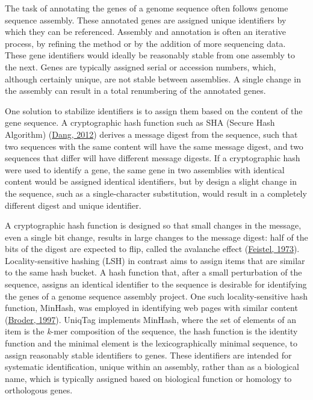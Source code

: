\documentclass{bioinfo}
\begin{document}
The task of annotating the genes of a genome sequence often follows
genome sequence assembly. These annotated genes are assigned unique
identifiers by which they can be referenced. Assembly and annotation is
often an iterative process, by refining the method or by the addition of
more sequencing data. These gene identifiers would ideally be reasonably
stable from one assembly to the next. Genes are typically assigned
serial or accession numbers, which, although certainly unique, are not
stable between assemblies. A single change in the assembly can result in
a total renumbering of the annotated genes.

One solution to stabilize identifiers is to assign them based on the
content of the gene sequence. A cryptographic hash function such as SHA
(Secure Hash Algorithm)
(\href{http://www.nist.gov/manuscript-publication-search.cfm?pub_id=910977}{Dang,
2012}) derives a message digest from the sequence, such that two
sequences with the same content will have the same message digest, and
two sequences that differ will have different message digests. If a
cryptographic hash were used to identify a gene, the same gene in two
assemblies with identical content would be assigned identical
identifiers, but by design a slight change in the sequence, such as a
single-character substitution, would result in a completely different
digest and unique identifier.

A cryptographic hash function is designed so that small changes in the
message, even a single bit change, results in large changes to the
message digest: half of the bits of the digest are expected to flip,
called the avalanche effect
(\href{http://www.scientificamerican.com/article/cryptography-and-computer-privacy/}{Feistel,
1973}). Locality-sensitive hashing (LSH) in contrast aims to assign
items that are similar to the same hash bucket. A hash function that,
after a small perturbation of the sequence, assigns an identical
identifier to the sequence is desirable for identifying the genes of a
genome sequence assembly project. One such locality-sensitive hash
function, MinHash, was employed in identifying web pages with similar
content (\href{http://dx.doi.org/10.1109/SEQUEN.1997.666900}{Broder,
1997}). UniqTag implements MinHash, where the set of elements of an item
is the \emph{k}-mer composition of the sequence, the hash function is
the identity function and the minimal element is the lexicographically
minimal sequence, to assign reasonably stable identifiers to genes.
These identifiers are intended for systematic identification, unique
within an assembly, rather than as a biological name, which is typically
assigned based on biological function or homology to orthologous genes.
\end{document}
